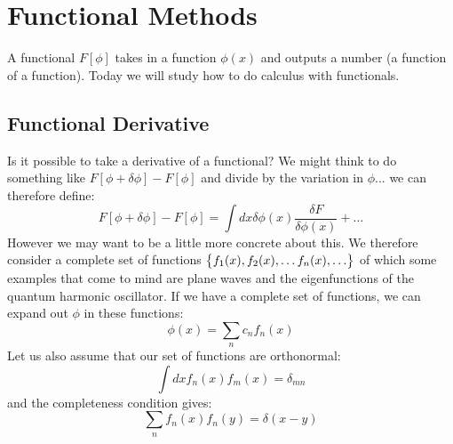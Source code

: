 \section{Functional Methods}
A functional $F[\phi]$ takes in a function $\phi(x)$ and outputs a number (a function of a function). Today we will study how to do calculus with functionals.

\subsection{Functional Derivative}
Is it possible to take a derivative of a functional? We might think to do something like $F[\phi + \delta \phi] - F[\phi]$ and divide by the variation in $\phi$... we can therefore define:
\begin{equation}
    F[\phi + \delta \phi] - F[\phi] = \int dx \delta \phi(x) \frac{\delta F}{\delta \phi(x)} + \ldots 
\end{equation}
However we may want to be a little more concrete about this. We therefore consider a complete set of functions $\set{f_1(x), f_2(x), \ldots f_n(x), \ldots}$ of which some examples that come to mind are plane waves and the eigenfunctions of the quantum harmonic oscillator. If we have a complete set of functions, we can expand out $\phi$ in these functions:
\begin{equation}
    \phi(x) = \sum_n c_n f_n(x)
\end{equation}
Let us also assume that our set of functions are orthonormal:
\begin{equation}
    \int dx f_n(x)f_m(x) = \delta_{mn}
\end{equation}
and the completeness condition gives:
\begin{equation}
    \sum_n f_n(x)f_n(y) = \delta(x - y)
\end{equation}

